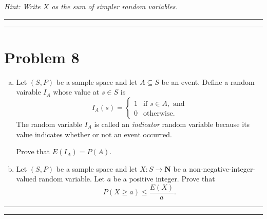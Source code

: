 \documentclass{article}
\theoremstyle{definition}
\newenvironment{solution}{\bigskip\hrule{\hfill}}{\bigskip\hrule{\hfill}} %
\begin{document}
\emph{Hint: Write $X$ as the sum of simpler random variables.}
\begin{solution}


\end{solution}


\newpage


\section*{Problem 8}

\begin{enumerate}[a)] %
    \item Let $\left(S,P\right)$ be a sample space and let $A\subseteq S$ be an event. Define a random vairable $I_A$ whose value at $s\in S$ is $$I_A\left(s\right)=\begin{cases}1 & \text{if }s\in A,\text{ and} \\ 0 & \text{otherwise.}\end{cases}$$ The random variable $I_A$ is called an \emph{indicator} random variable because its value indicates whether or not an event occurred. 

    Prove that $E\left(I_A\right)=P\left(A\right)$.

    \item Let $\left(S,P\right)$ be a sample space and let $X:S\longrightarrow\mathbf{N}$ be a non-negative-integer-valued random variable. Let $a$ be a positive integer. Prove that $$P\left(X\geq a\right)\leq\frac{E\left(X\right)}{a}.$$
\end{enumerate}
\begin{solution}


\end{solution}

\end{document}

